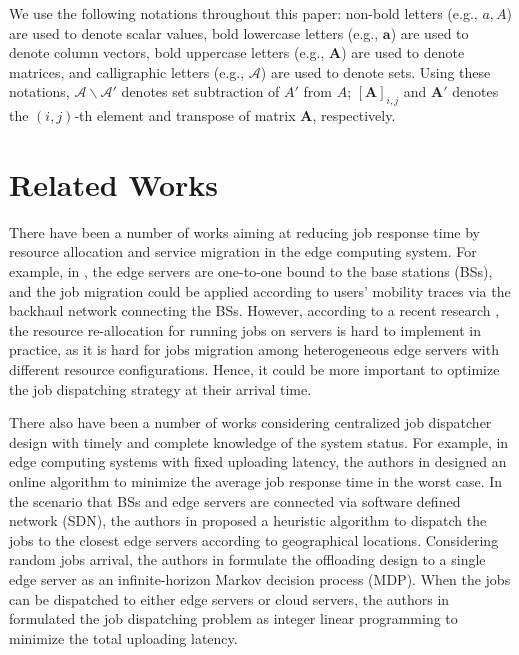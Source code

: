 We use the following notations throughout this paper: 
non-bold letters (e.g., $a, A$) are used to denote scalar values,
bold lowercase letters (e.g., $\mathbf{a}$) are used to denote column vectors,
bold uppercase letters (e.g., $\mathbf{A}$) are used to denote matrices,
and calligraphic letters (e.g., $\mathcal{A}$) are used to denote sets.
Using these notations, $\mathcal{A}\backslash\mathcal{A'}$ denotes set subtraction of $A'$ from $A$; $[\mathbf{A}]_{i,j}$ and $\mathbf{A}'$ denotes the $(i,j)$-th element and transpose of matrix $\mathbf{A}$, respectively.

\section{Related Works}
\label{sec:review}
There have been a number of works aiming at reducing job response time by resource allocation and service migration in the edge computing system.
For example, in \cite{TON19-WangSq}, the edge servers are one-to-one bound to the base stations (BSs), and the job migration could be applied according to users' mobility traces via the backhaul network connecting the BSs.
However, according to a recent research \cite{INFOCOM19-WuC}, the resource re-allocation for running jobs on servers is hard to implement in practice, as it is hard for jobs migration among heterogeneous edge servers with different resource configurations.
Hence, it could be more important to optimize the job dispatching strategy at their arrival time.

There also have been a number of works considering centralized job dispatcher design with timely and complete knowledge of the system status.
For example, in edge computing systems with fixed uploading latency, the authors in \cite{tan-online} designed an online algorithm to minimize the average job response time in the worst case.
In the scenario that BSs and edge servers are connected via software defined network (SDN), the authors in \cite{IOTJ18-FanQ} proposed a heuristic algorithm to dispatch the jobs to the closest edge servers according to geographical locations.
Considering random jobs arrival, the authors in \cite{mdp-globecom,mdp-tvt} formulate the offloading design to a single edge server as an infinite-horizon Markov decision process (MDP).
When the jobs can be dispatched to either edge servers or cloud servers, the authors in \cite{MASS18-MengZ} formulated the job dispatching problem as integer linear programming to minimize the total uploading latency. %


